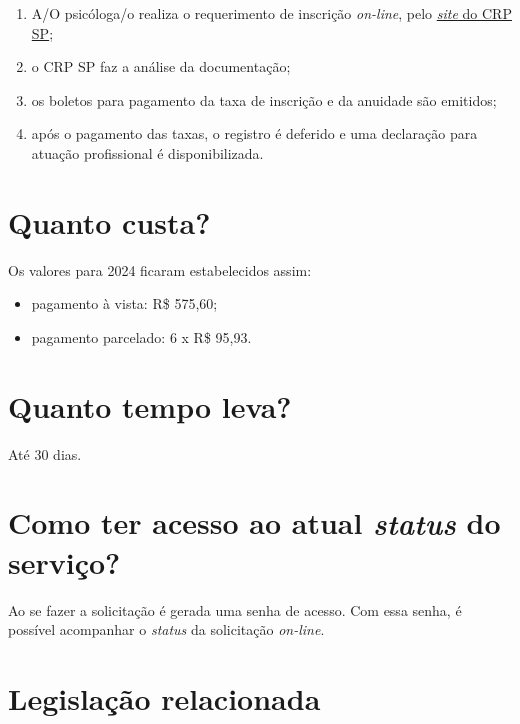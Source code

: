 \begin{enumerate}
\item	A/O psicóloga/o realiza o requerimento de inscrição \textit{on-line}, pelo \href{https://www.crpsp.org/pagina/view/308}{\textit{site} do CRP SP};
\item	o CRP SP faz a análise da documentação;
\item	os boletos para pagamento da taxa de inscrição e da anuidade são emitidos;
\item	após o pagamento das taxas, o registro é deferido e uma declaração para atuação profissional é disponibilizada.
\end{enumerate}

\section{Quanto custa?}

Os valores para 2024 ficaram estabelecidos assim:

\begin{itemize}
\item	pagamento à vista: R\$ 575,60;
\item	pagamento parcelado: 6 x R\$ 95,93.
\end{itemize}

\section{Quanto tempo leva?}

Até 30 dias.

\section{Como ter acesso ao atual \emph{status} do serviço?}

Ao se fazer a solicitação é gerada uma senha de acesso. Com essa senha, é possível acompanhar o \textit{status} da solicitação \textit{on-line}.

\section{Legislação relacionada}


